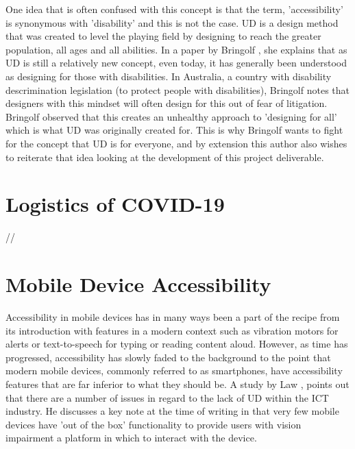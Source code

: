 One idea that is often confused with this concept is that the term, 'accessibility' is synonymous with 'disability' and this is not the case.
UD is a design method that was created to level the playing field by designing to reach the greater population, all ages and all abilities.
In a paper by Bringolf \cite{accessible}, she explains that as UD is still a relatively new concept, even today, it has generally been understood as designing for those with disabilities.
In Australia, a country with disability descrimination legislation (to protect people with disabilities), Bringolf notes that designers with this mindset will often design for this out of fear of litigation.
Bringolf observed that this creates an unhealthy approach to 'designing for all' which is what UD was originally created for. %
This is why Bringolf wants to fight for the concept that UD is for everyone, and by extension this author also wishes to reiterate that idea looking at the development of this project deliverable. %


\section{Logistics of COVID-19}
//


\section{Mobile Device Accessibility}
Accessibility in mobile devices has in many ways been a part of the recipe from its introduction with features in a modern context such as vibration motors for alerts or text-to-speech for typing or reading content aloud.
However, as time has progressed, accessibility has slowly faded to the background to the point that modern mobile devices, commonly referred to as smartphones, have accessibility features that are far inferior to what they should be. %
A study by Law \cite{smartphone}, points out that there are a number of issues in regard to the lack of UD within the ICT industry.
He discusses a key note at the time of writing in that very few mobile devices have 'out of the box' functionality to provide users with vision impairment a platform in which to interact with the device. %

